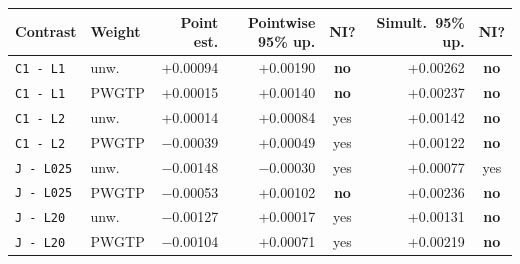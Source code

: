 \begin{tabular}{@{}llrrcrc@{}}
\toprule
Contrast & Weight & Point est. & Pointwise 95\% up. & NI? & Simult.\ 95\% up. & NI? \\
\midrule
\texttt{C1 - L1} & unw. & +0.00094 & +0.00190 & \textbf{no} & +0.00262 & \textbf{no} \\
\texttt{C1 - L1} & PWGTP & +0.00015 & +0.00140 & \textbf{no} & +0.00237 & \textbf{no} \\
\texttt{C1 - L2} & unw. & +0.00014 & +0.00084 & yes & +0.00142 & \textbf{no} \\
\texttt{C1 - L2} & PWGTP & $-$0.00039 & +0.00049 & yes & +0.00122 & \textbf{no} \\
\texttt{J - L025} & unw. & $-$0.00148 & $-$0.00030 & yes & +0.00077 & yes \\
\texttt{J - L025} & PWGTP & $-$0.00053 & +0.00102 & \textbf{no} & +0.00236 & \textbf{no} \\
\texttt{J - L20} & unw. & $-$0.00127 & +0.00017 & yes & +0.00131 & \textbf{no} \\
\texttt{J - L20} & PWGTP & $-$0.00104 & +0.00071 & yes & +0.00219 & \textbf{no} \\
\bottomrule
\end{tabular}
